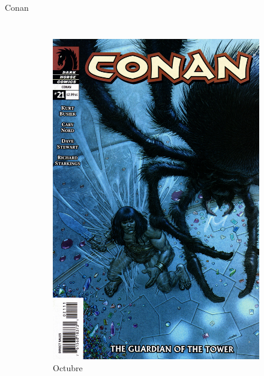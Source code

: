 \begin{frame}{Conan}
\begin{columns}
\begin{figure}[htp]
\begin{subfigure}[b]{0.3\textwidth}
   \includegraphics[width=\textwidth]{img/DarkHorse21Portada}
   \caption{Octubre}
 \end{subfigure}
 ~
 \begin{subfigure}[b]{0.3\textwidth}

\end{subfigure}
\end{figure}
\end{columns}
\end{frame}
